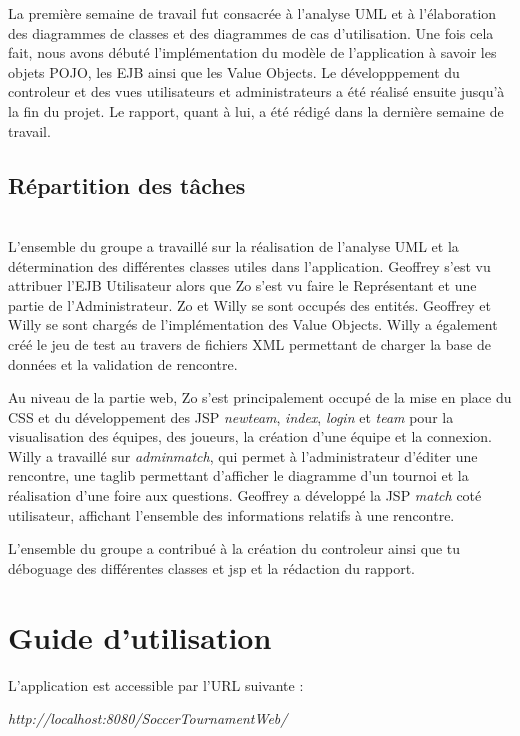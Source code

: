 \documentclass[10pt]{report}
\begin{document}
La première semaine de travail fut consacrée à l'analyse UML et à l'élaboration des diagrammes de classes et des diagrammes de cas d'utilisation. Une fois cela fait, nous avons débuté l'implémentation du modèle de l'application à savoir les objets POJO, les EJB ainsi que les Value Objects. Le développpement du controleur et des vues utilisateurs et administrateurs a été réalisé ensuite jusqu'à la fin du projet. Le rapport, quant à lui, a été rédigé dans la dernière semaine de travail.\\

\section{Répartition des tâches}
~\\

L'ensemble du groupe a travaillé sur la réalisation de l'analyse UML et la détermination des différentes classes utiles dans l'application.
Geoffrey s'est vu attribuer l'EJB Utilisateur alors que Zo s'est vu faire le Représentant et une partie de l'Administrateur.
Zo et Willy se sont occupés des entités.
Geoffrey et Willy se sont chargés de l'implémentation des Value Objects.
Willy a également créé le jeu de test au travers de fichiers XML permettant de charger la base de données et la validation de rencontre.

Au niveau de la partie web, Zo s'est principalement occupé de la mise en place du CSS et du développement des JSP  \textit{newteam}, \textit{index}, \textit{login} et \textit{team} pour la visualisation des équipes, des joueurs, la création d'une équipe et la connexion.
Willy a travaillé sur \textit{adminmatch}, qui permet à l'administrateur d'éditer une rencontre, une taglib permettant d'afficher le diagramme d'un tournoi et la réalisation d'une foire aux questions.
Geoffrey a développé la JSP \textit{match} coté utilisateur, affichant l'ensemble des informations relatifs à une rencontre.

L'ensemble du groupe a contribué à la création du controleur ainsi que tu déboguage des différentes classes et jsp et la rédaction du rapport.
  
\chapter{Guide d'utilisation}


L'application est accessible par l'URL suivante :
\begin{center}
\textit{http://localhost:8080/SoccerTournamentWeb/}
\end{center}
\end{document}

